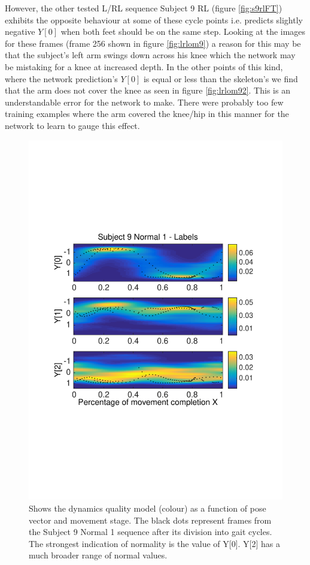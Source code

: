 \documentclass[11pt]{article} %
\begin{document}
However, the other tested L/RL sequence Subject 9 RL (figure \ref{fig:s9rlFT}) exhibits the opposite behaviour at some of these cycle points i.e. predicts slightly negative $Y[0]$ when both feet should be on the same step. Looking at the images for these frames (frame 256 shown in figure \ref{fig:lrlom9}) a reason for this may be that the subject's left arm swings down across his knee which the network may be mistaking for a knee at increased depth. In the other points of this kind, where the network prediction's $Y[0]$ is equal or less than the skeleton's we find that the arm does not cover the knee as seen in figure \ref{fig:lrlom92}. This is an understandable error for the network to make. There were probably too few training examples where the arm covered the knee/hip in this manner for the network to learn to gauge this effect. 

\begin{figure}
\centering
\includegraphics*[width=0.73\linewidth,trim={0cm 7.5cm 0cm 6.7cm},clip]{quality_s9n1_FT_labels.pdf}
\caption{Shows the dynamics quality model (colour) as a function of pose vector and movement stage. The black dots represent frames from the Subject 9 Normal 1 sequence after its division into gait cycles. The strongest indication of normality is the value of Y[0]. Y[2] has a much broader range of normal values.}
\label{fig:qualityHeatMap}
\end{figure}
\end{document}
